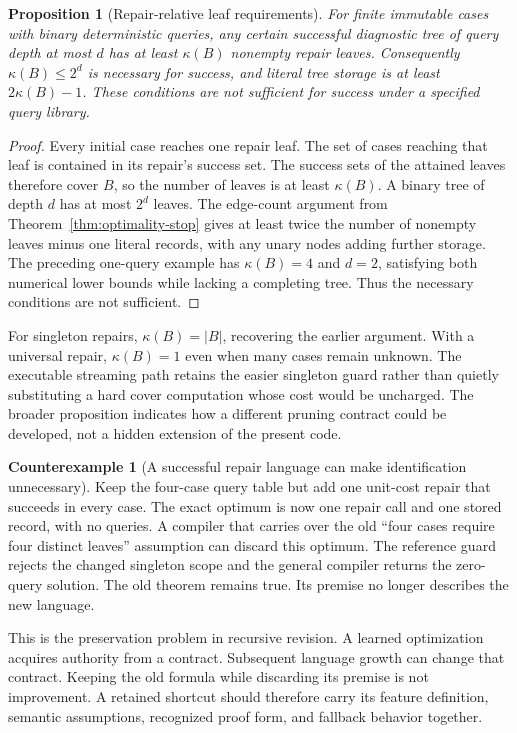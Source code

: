 \documentclass[11pt,letterpaper]{article}
\theoremstyle{plain}
\newtheorem{proposition}[theorem]{Proposition}
\theoremstyle{definition}
\newtheorem{counterexample}[theorem]{Counterexample}
\begin{document}
\begin{proposition}[Repair-relative leaf requirements]\label{prop:repair-cover}
For finite immutable cases with binary deterministic queries, any certain successful diagnostic tree of query depth at most $d$ has at least $\kappa(B)$ nonempty repair leaves. Consequently $\kappa(B)\leq2^d$ is necessary for success, and literal tree storage is at least $2\kappa(B)-1$. These conditions are not sufficient for success under a specified query library.
\end{proposition}
\begin{proof}
Every initial case reaches one repair leaf. The set of cases reaching that leaf is contained in its repair's success set. The success sets of the attained leaves therefore cover $B$, so the number of leaves is at least $\kappa(B)$. A binary tree of depth $d$ has at most $2^d$ leaves. The edge-count argument from Theorem~\ref{thm:optimality-stop} gives at least twice the number of nonempty leaves minus one literal records, with any unary nodes adding further storage. The preceding one-query example has $\kappa(B)=4$ and $d=2$, satisfying both numerical lower bounds while lacking a completing tree. Thus the necessary conditions are not sufficient.
\end{proof}

For singleton repairs, $\kappa(B)=|B|$, recovering the earlier argument. With a universal repair, $\kappa(B)=1$ even when many cases remain unknown. The executable streaming path retains the easier singleton guard rather than quietly substituting a hard cover computation whose cost would be uncharged. The broader proposition indicates how a different pruning contract could be developed, not a hidden extension of the present code.

\begin{counterexample}[A successful repair language can make identification unnecessary]\label{ex:scope-repair-change}
Keep the four-case query table but add one unit-cost repair that succeeds in every case. The exact optimum is now one repair call and one stored record, with no queries. A compiler that carries over the old ``four cases require four distinct leaves'' assumption can discard this optimum. The reference guard rejects the changed singleton scope and the general compiler returns the zero-query solution. The old theorem remains true. Its premise no longer describes the new language.
\end{counterexample}

This is the preservation problem in recursive revision. A learned optimization acquires authority from a contract. Subsequent language growth can change that contract. Keeping the old formula while discarding its premise is not improvement. A retained shortcut should therefore carry its feature definition, semantic assumptions, recognized proof form, and fallback behavior together.
\end{document}

